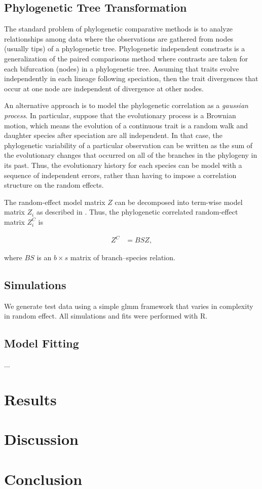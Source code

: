 \documentclass[12pt]{article}
\begin{document}
\subsection{Phylogenetic Tree Transformation}
The standard problem of phylogenetic comparative methods is to analyze relationships among data where the observations are gathered from nodes (usually tips) of a phylogenetic tree.
Phylogenetic independent constrasts is a generalization of the paired comparisons method where contrasts are taken for each bifurcation (nodes) in a phylogenetic tree. 
Assuming that traits evolve independently in each lineage following speciation, then the trait divergences that occur at one node are independent of divergence at other nodes.  

An alternative approach is to model the phylogenetic correlation as a \textit{gaussian process}. 
In particular, suppose that the evolutionary process is a Brownian motion, which means the evolution of a continuous trait is a random walk and daughter species after speciation are all independent.  
In that case, the phylogenetic variability of a particular observation can be written as the sum of the evolutionary changes that occurred on all of the branches in the phylogeny in its past. 
Thus, the evolutionary history for each species can be model with a sequence of independent errors, rather than having to impose a correlation structure on the random effects. 


The random-effect model matrix $Z$ can be decomposed into term-wise model matrix $Z_{i}$ as described in .
Thus, the phylogenetic correlated random-effect matrix $Z^{C}_{i}$ is

\begin{align}
Z^{C} & = BS Z ,
\end{align}

where $BS$ is an $b \times s$ matrix of branch--species relation. 


\subsection{Simulations}

We generate test data using a simple glmm framework that varies in complexity in random effect. All simulations and fits were performed with R. 

\subsection{Model Fitting}

...


\section{Results}

\section{Discussion}

\section{Conclusion}
\end{document}
